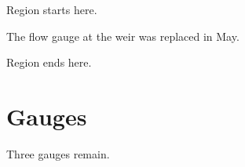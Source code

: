 \documentclass[11pt]{article}
\begin{document}
Region starts here.

The flow gauge at the weir  was replaced in May.

Region ends here.

\section{Gauges}
Three gauges remain.
\end{document}

